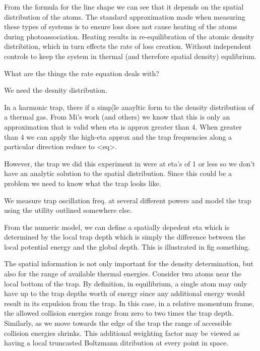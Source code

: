 From the formula for the line shape we can see that it depends on the spatial distribution of the atoms. The standard approximation made when measuring these types of systems is to ensure loss does not cause heating of the atoms during photoassociation. Heating results in re-equilibration of the atomic density distribition, which in turn effects the rate of loss creation. Without independent controls to keep the system in thermal (and therefore spatial density) equlibrium.

What are the things the rate equation deals with?

We need the desnity distribution.

In a harmonic trap, there if a simp[le anayltic form to the density distribution of a thermal gas. From Mi's work (and others) we know that this is only an approximation that is valid when eta is approx greater than 4. When greater than 4 we can apply the high-eta approx and the trap frequencies along a particular direction reduce to <eq>.

However, the trap we did this experiment in were at eta's of 1 or less so we don't have an analytic solution to the spatial distribution. Since this could be a problem we need to know what the trap looks like.

We measure trap oscillation freq. at several different powers and model the trap using the utility outlined somewhere else.

From the numeric model, we can define a spatially depedent eta which is determined by the local trap depth which is simply the difference between the local potential energy and the global depth. This is illustrated in fig something.

The spatial information is not only important for the density determination, but also for the range of available thermal energies. Consider two atoms near the local bottom of the trap. By definition, in equilibrium, a single atom may only have up to the trap depths worth of energy since any additional energy would result in its expulsion from the trap. In this case, in a relative momentum frame, the allowed collision energies range from zero to two times the trap depth. Similarly, as we move towards the edge of the trap the range of accessible collision energies shrinks. This additional weighting factor may be viewed as having a local truncasted Boltzmann ditribution at every point in space. 

